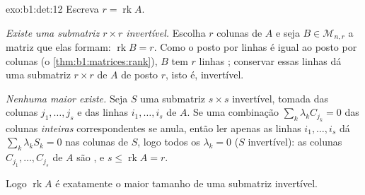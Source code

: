 \begin{solution}{exo:b1:det:12}
Escreva $r = \operatorname{rk} A$.

\emph{Existe uma submatriz $r \times r$ invertível.} Escolha $r$ colunas
 de $A$ e seja $B \in \mathcal{M}_{n,r}$ a matriz que elas formam: $\operatorname{rk} B = r$. Como o
posto por linhas é igual ao posto por colunas (o \cref{thm:b1:matrices:rank}), $B$ tem $r$
linhas ; conservar essas linhas dá uma submatriz $r \times r$ de $A$
de posto $r$, isto é, invertível.

\emph{Nenhuma maior existe.} Seja $S$ uma submatriz $s \times s$
invertível, tomada das colunas $j_1, \dots, j_s$ e das linhas $i_1,
\dots, i_s$ de $A$. Se
uma combinação $\sum_k \lambda_k
C_{j_k} = 0$ das colunas \emph{inteiras} correspondentes se
anula, então ler apenas as linhas $i_1, \dots, i_s$ dá $\sum_k
\lambda_k S_k = 0$ nas colunas de $S$,
logo todos os $\lambda_k = 0$ ($S$ invertível): as colunas $C_{j_1}, \dots, C_{j_s}$ de $A$ são
, e $s \leq \operatorname{rk} A = r$.

Logo $\operatorname{rk} A$ é exatamente o maior tamanho de uma submatriz invertível.
\end{solution}

